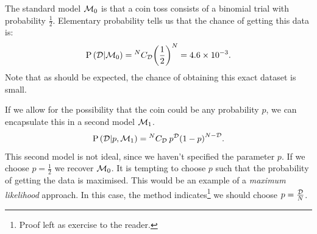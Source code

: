 The standard model \(\mathcal{M}_0\) is that a coin toss consists of a binomial trial with probability \(\frac{1}{2}\). Elementary probability tells us that the chance of getting this data is:
\begin{equation}
  \mathrm{P}\left(\mathcal{D}\middle|\mathcal{M}_0\right)= {^{N}C_{\mathcal{D}}} {\left( \frac{1}{2} \right)}^{N}  = 4.6\times 10^{-3}.
  \label{eqn:bay:M0}
\end{equation}
Note that as should be expected, the chance of obtaining this exact dataset is small. 

If we allow for the possibility that the coin could be any probability \(p\), we can encapsulate this in a second model \(\mathcal{M}_1\).
\begin{equation}
  \mathrm{P}\left(\mathcal{D}\middle|p,\mathcal{M}_1\right)= {^{N}C_{\mathcal{D}}}\: {p}^{\mathcal{D}} {\left(1 - p \right)}^{N-\mathcal{D}}.
  \label{eqn:bay:M1}
\end{equation}
This second model is not ideal, since we haven't specified the parameter \(p\). If we choose \(p=\frac{1}{2}\) we recover \(\mathcal{M}_0\). It is tempting to choose \(p\) such that the probability of getting the data is maximised. This would be an example of a {\em maximum likelihood\/} approach. In this case, the method indicates\footnote{Proof left as exercise to the reader.} we should choose \(p = \frac{\mathcal{D}}{N}\). 

